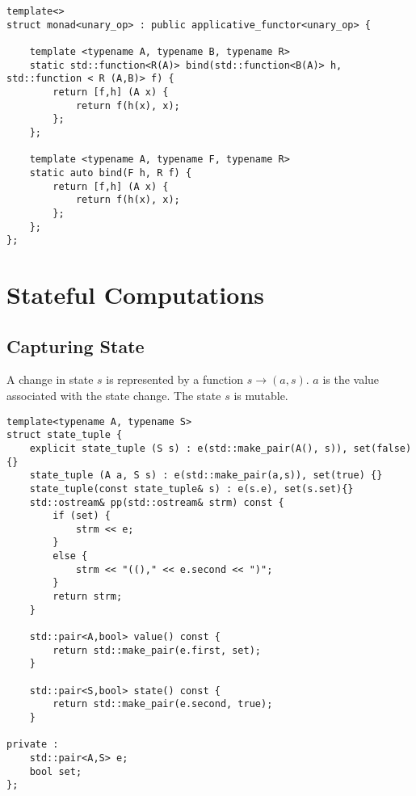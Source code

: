 \documentclass[12pt,fleqn]{article}
\begin{document}
\begin{minipage}{\linewidth}
\begin{lstlisting}[caption=monad for unary operators, label=monadop]
template<>
struct monad<unary_op> : public applicative_functor<unary_op> {

	template <typename A, typename B, typename R>
	static std::function<R(A)> bind(std::function<B(A)> h, std::function < R (A,B)> f) {
		return [f,h] (A x) {
			return f(h(x), x);
		};
	};
	
	template <typename A, typename F, typename R>
	static auto bind(F h, R f) {
		return [f,h] (A x) {
			return f(h(x), x);
		};
	};
};
\end{lstlisting}
\end{minipage}




\section{Stateful Computations}

\subsection{Capturing State}
%
%

A change in state $s$ is represented by a function $s \rightarrow (a,s)$. 
$a$ is the value associated with the state change.
The state $s$ is mutable.

%
%
%
\begin{minipage}{\linewidth}
\begin{lstlisting}[caption=state tuple, label=state_tuple]
template<typename A, typename S>
struct state_tuple {
	explicit state_tuple (S s) : e(std::make_pair(A(), s)), set(false){}
	state_tuple (A a, S s) : e(std::make_pair(a,s)), set(true) {}
	state_tuple(const state_tuple& s) : e(s.e), set(s.set){}
	std::ostream& pp(std::ostream& strm) const {
		if (set) {
			strm << e;
		}
		else {
			strm << "(()," << e.second << ")";
		}
		return strm;
	}

	std::pair<A,bool> value() const {
		return std::make_pair(e.first, set);
	}

	std::pair<S,bool> state() const {
		return std::make_pair(e.second, true);
	}

private :	
	std::pair<A,S> e;
	bool set;
};
\end{lstlisting}
\end{minipage}
%
%
%
\end{document}
